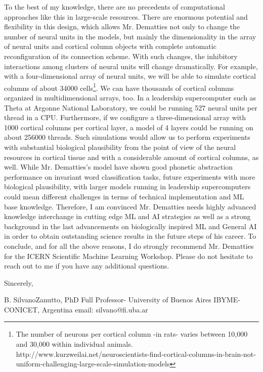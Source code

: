 \documentclass{article}
\begin{document}
To the best of my knowledge, there are no precedents of computational approaches like this in large-scale resources. There are enormous potential and flexibility in this design, which allows Mr. Dematties not only to change the number of neural units in the models, but mainly the dimensionality in the array of neural units and cortical column objects with complete automatic reconfiguration of its connection scheme. With such changes, the inhibitory interactions among clusters of neural units will change dramatically. For example, with a four-dimensional array of neural units, we will be able to simulate cortical columns of about 34000 cells\footnote{The number of neurons per cortical column -in rats- varies between 10,000 and 30,000 within individual animals.	http://www.kurzweilai.net/neuroscientists-find-cortical-columns-in-brain-not-uniform-challenging-large-scale-simulation-models}. We can have thousands of cortical columns organized in multidimensional arrays, too. In a leadership supercomputer such as Theta at Argonne National Laboratory, we could be running 527 neural units per thread in a CPU. Furthermore, if we configure a three-dimensional array with 1000 cortical columns per cortical layer, a model of 4 layers could be running on about 256000 threads. Such simulations would allow us to perform experiments with substantial biological plausibility from the point of view of the neural resources in cortical tissue and with a considerable amount of cortical columns, as well.
While Mr. Dematties’s model have shown good phonetic abstraction performance on invariant word classification tasks, future experiments with more biological plausibility, with larger models running in leadership supercomputers could mean different challenges in terms of technical implementation and ML base knowledge. Therefore, I am convinced Mr. Dematties needs highly advanced knowledge interchange in cutting edge ML and AI strategies as well as a strong background in the last advancements on biologically inspired ML and General AI in order to obtain outstanding science results in the future steps of his career.
To conclude, and for all the above reasons, I do strongly recommend Mr. Dematties for the ICERN Scientific Machine Learning Workshop. Please do not hesitate to reach out to me if you have any additional questions.

Sincerely,



B. SilvanoZanutto, PhD
Full Professor- University of Buenos Aires
IBYME-CONICET, Argentina
email: silvano@fi.uba.ar
\end{document}
